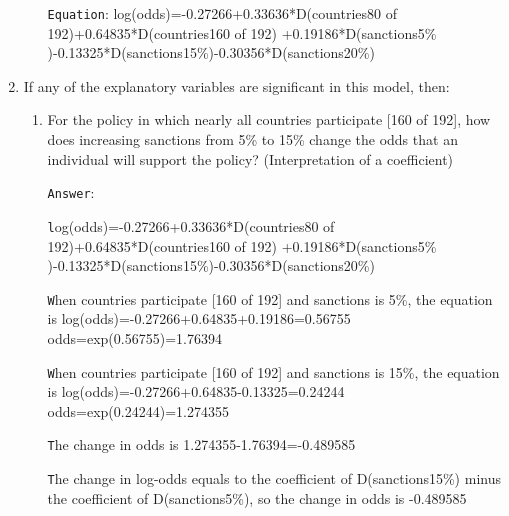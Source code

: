 \documentclass[12pt,letterpaper]{article}
\begin{document}
\begin{enumerate}
\begin{enumerate}
		\vspace{.5cm}
		
		\texttt{Equation}: log(odds)=-0.27266+0.33636*D(countries80 of 192)+0.64835*D(countries160 of 192)  +0.19186*D(sanctions5\% )-0.13325*D(sanctions15\%)-0.30356*D(sanctions20\%)
				\vspace{3cm}
	\end{enumerate}
	
	\item
	If any of the explanatory variables are significant in this model, then:
	\begin{enumerate}
		\item
		For the policy in which nearly all countries participate [160 of 192], how does increasing sanctions from 5\% to 15\% change the odds that an individual will support the policy? (Interpretation of a coefficient)

	\vspace{3cm}

\texttt{Answer}:

\vspace{.5cm}

\texttt log(odds)=-0.27266+0.33636*D(countries80 of 192)+0.64835*D(countries160 of 192)     +0.19186*D(sanctions5\% )-0.13325*D(sanctions15\%)-0.30356*D(sanctions20\%) 

\vspace{.5cm}

\texttt When countries participate [160 of 192] and sanctions is 5\%, the equation is log(odds)=-0.27266+0.64835+0.19186=0.56755 
odds=exp(0.56755)=1.76394 

\vspace{.5cm}

\texttt When countries participate [160 of 192] and sanctions is 15\%, the equation is log(odds)=-0.27266+0.64835-0.13325=0.24244
odds=exp(0.24244)=1.274355 

\vspace{.5cm}

\texttt The change in odds is 1.274355-1.76394=-0.489585 

\vspace{.5cm}

\texttt The change in log-odds equals to the coefficient of D(sanctions15\%) minus the coefficient of D(sanctions5\%), so the change in odds is -0.489585


\end{enumerate}
\end{enumerate}
\end{document}
